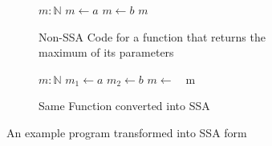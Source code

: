 \begin{figure}[h]
    \begin{subfigure}[b]{0.5\textwidth}
        \centering
        \begin{algorithmic}
            \State $m: \mathbb{N}$
            \State $m \gets a$
            \Else
            \State $m \gets b$
            \EndIf
            \State \Return $m$
            \EndFunction
        \end{algorithmic}
        \subfigfill
        \caption{Non-SSA Code for a function that returns the maximum of its parameters}
    \end{subfigure}
    \begin{subfigure}[b]{0.5\textwidth}
        \centering
        \begin{algorithmic}
            \State $m: \mathbb{N}$
            \State $m_1 \gets a$
            \Else
            \State $m_2 \gets b$
            \EndIf
            \State $m \gets\text{ }$ 
            \State \Return m
            \EndFunction
        \end{algorithmic}
        \subfigfill
        \caption{Same Function converted into SSA}
    \end{subfigure}
    \caption{An example program transformed into SSA form}
    \label{fig:basics:SSA-phi}
\end{figure}